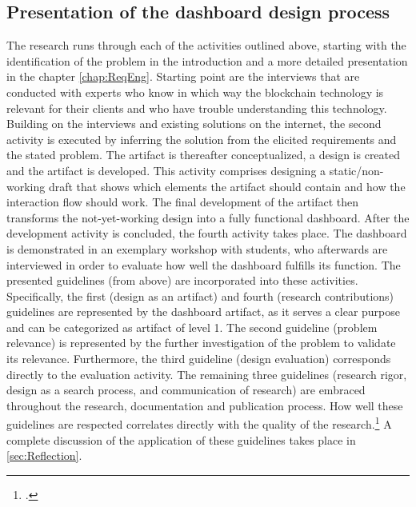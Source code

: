\subsection{Presentation of the dashboard design process}
The research runs through each of the activities outlined above, starting with the identification of the problem in the introduction and a more detailed presentation in the chapter \ref{chap:ReqEng}. Starting point are the interviews that are conducted with experts who know in which way the blockchain technology is relevant for their clients and who have trouble understanding this technology. Building on the interviews and existing solutions on the internet, the second activity is executed by inferring the solution from the elicited requirements and the stated problem. The artifact is thereafter conceptualized, a design is created and the artifact is developed. This activity comprises designing a static/non-working draft that shows which elements the artifact should contain and how the interaction flow should work. The final development of the artifact then transforms the not-yet-working design into a fully functional dashboard. After the development activity is concluded, the fourth activity takes place. The dashboard is demonstrated in an exemplary workshop with students, who afterwards are interviewed in order to evaluate how well the dashboard fulfills its function. The presented guidelines (from above) are incorporated into these activities. Specifically, the first (design as an artifact) and fourth (research contributions) guidelines are represented by the dashboard artifact, as it serves a clear purpose and can be categorized as artifact of level 1. The second guideline (problem relevance) is represented by the further investigation of the problem to validate its relevance. Furthermore, the third guideline (design evaluation) corresponds directly to the evaluation activity. The remaining three guidelines (research rigor, design as a search process, and communication of research) are embraced throughout the research, documentation and publication process. How well these guidelines are respected correlates directly with the quality of the research.\footcite[Cf.][p.19]{HevnerDesignResearchInformation2010} A complete discussion of the application of these guidelines takes place in \ref{sec:Reflection}.


